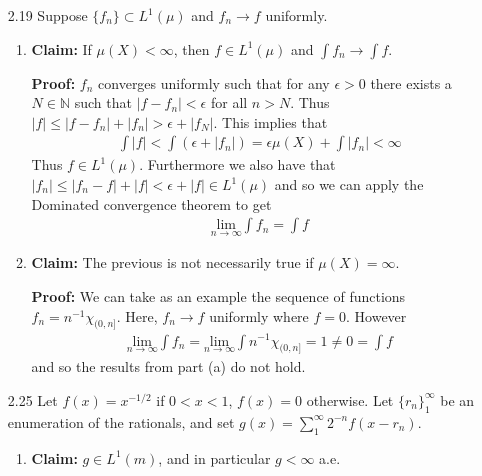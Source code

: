 \documentclass[11pt,letter]{article}
\begin{document}
\begin{enumerate}
    \item [2.19] Suppose $\{f_n\} \subset L^1(\mu)$ and $f_n \rightarrow f$ uniformly.
    \begin{enumerate}
        \item \textbf{Claim:} If $\mu(X) < \infty$, then $f \in L^1(\mu)$ and $\int f_n \rightarrow \int f$.
        
        \textbf{Proof:} $f_n$ converges uniformly such that for any $\epsilon > 0$ there exists a $N \in \mathbb{N}$ such that $|f - f_n| < \epsilon$ for all $n > N$. Thus $|f| \le |f - f_n| + |f_n| > \epsilon + |f_N|$. This implies that
        \begin{align*}
            \int |f| < \int (\epsilon + |f_n|) = \epsilon \mu(X) + \int |f_n| < \infty
        \end{align*}    
        Thus $f \in L^1(\mu)$. Furthermore we also have that $|f_n| \le |f_n - f| + |f| < \epsilon + |f| \in L^1(\mu)$ and so we can apply the Dominated convergence theorem to get
        \begin{align*}
            \underset{n \rightarrow \infty}{\text{lim}} \int f_n = \int f 
        \end{align*}

        \item \textbf{Claim:} The previous is not necessarily true if $\mu(X) = \infty$.
        
        \textbf{Proof:} We can take as an example the sequence of functions $f_n = n^{-1}\chi_{(0,n]}$. Here, $f_n \rightarrow f$ uniformly where $f=0$. However
        \begin{align*}
            \underset{n \rightarrow \infty}{\text{lim}} \int f_n = \underset{n \rightarrow \infty}{\text{lim}} \int n^{-1}\chi_{(0,n]} = 1 \ne 0 = \int f 
        \end{align*}
        and so the results from part (a) do not hold.
    \end{enumerate}

    \item [2.25] Let $f(x) = x^{-1/2}$ if $0 < x < 1$, $f(x) = 0$ otherwise. Let $\{r_n\}_1^\infty$ be an enumeration of the rationals, and set $g(x) = \sum_1^\infty 2^{-n}f(x - r_n)$.
    \begin{enumerate}
        \item \textbf{Claim:} $g \in L^1(m)$, and in particular $g < \infty$ a.e.
        

\end{enumerate}
\end{enumerate}
\end{document}
